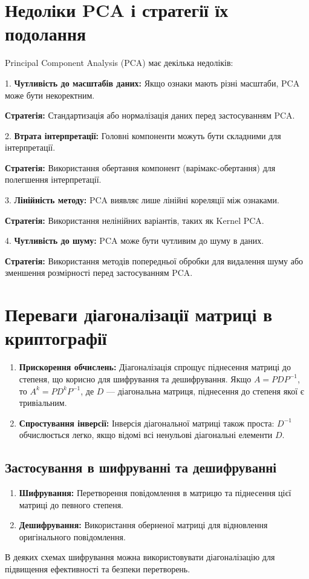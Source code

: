 \documentclass{article}
\begin{document}
\section*{Недоліки PCA і стратегії їх подолання}

Principal Component Analysis (PCA) має декілька недоліків:

1. \textbf{Чутливість до масштабів даних:} Якщо ознаки мають різні масштаби, PCA 
може бути некоректним.

   \textbf{Стратегія:} Стандартизація або нормалізація даних перед застосуванням PCA.

2. \textbf{Втрата інтерпретації:} Головні компоненти можуть бути складними 
для інтерпретації.

   \textbf{Стратегія:} Використання обертання компонент (варімакс-обертання) для полегшення інтерпретації.

3. \textbf{Лінійність методу:} PCA виявляє лише лінійні кореляції між ознаками.

   \textbf{Стратегія:} Використання нелінійних варіантів, таких як Kernel PCA.

4. \textbf{Чутливість до шуму:} PCA може бути чутливим до шуму в даних.

   \textbf{Стратегія:} Використання методів попередньої обробки для видалення шуму або зменшення розмірності перед застосуванням PCA.

\section*{Переваги діагоналізації матриці в криптографії}

\begin{enumerate}
   \item \textbf{Прискорення обчислень:} Діагоналізація спрощує піднесення матриці до степеня, що корисно для шифрування та дешифрування.
   Якщо \( A = PDP^{-1} \), то \( A^k = PD^kP^{-1} \), де \( D \) — діагональна матриця, піднесення до степеня якої є тривіальним.

   \item \textbf{Спростування інверсії:} Інверсія діагональної матриці також проста:
   \( D^{-1} \) обчислюється легко, якщо відомі всі ненульові діагональні елементи \( D \).

\end{enumerate}


\subsection*{Застосування в шифруванні та дешифруванні}

\begin{enumerate}
   \item \textbf{Шифрування:} Перетворення повідомлення в матрицю та піднесення цієї матриці до певного степеня.
   \item \textbf{Дешифрування:} Використання оберненої матриці для відновлення оригінального повідомлення.
\end{enumerate}

В деяких схемах шифрування можна використовувати діагоналізацію для підвищення 
ефективності та безпеки перетворень.
\end{document}
